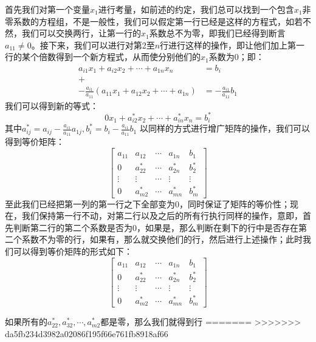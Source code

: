 \documentclass[a4paper,12pt]{ctexart}
\begin{document}
	\indent
	首先我们对第一个变量$x_1$进行考量，如前述的约定，我们总可以找到一个包含$x_1$非零系数的方程组，不是一般性，我们可以假定第一行已经是这样的方程式，如若不然，我们可以交换两行，让第一行的$x_1$系数总不为零，即我们已经得到断言$a_11 \neq 0$。接下来，我们可以进行对第2至$n$行进行这样的操作，即让他们加上第一行的某个倍数得到一个新方程式，从而使分别他们的$x_1$系数为0；即：
	\begin{align*}
	a_{i1}x_1+a_{i2}x_2 + \cdots + a_{1n}x_n &= b_i\\
	+\\
	-\frac{a_{i1}}{a_{11}}(a_{11}x_1+a_{12}x_2+\cdots+a_{1n}) &= -\frac{a_{i1}}{a_{11}}b_1
	\end{align*}
	我们可以得到新的等式：
	$$
	0{x_1}+a_{i2}^*x_2+\cdots+a_{in}^*x_n = b_i^*
	$$
	其中$a_{ij}^*=a_{ij}-\frac{a_{i1}}{a_{11}}a_{1j},b_i^*=b_i-\frac{a_{i1}}{a_{11}}b_1$
	以同样的方式进行增广矩阵的操作，我们可以得到等价矩阵：
	$$
		\left[
		\begin{array}{ccccc}
		a_{11} 	& a_{12} & \cdots & a_{1n} & b_1 \\
		0 		& a_{22}^* & \cdots & a_{2n}^* & b_2^* \\
		\vdots 	& \vdots & \cdots & \vdots & \vdots\\
		0 		& a_{m2}^* & \cdots & a_{mn}^* & b_m^*
		\end{array}
		\right]
	$$
	至此我们已经把第一列的第一行之下全部变为0，同时保证了矩阵的等价性；现在，我们保持第一行不动，对第二行以及之后的所有行执行同样的操作，意即，首先判断第二行的第二个系数是否为0，如果是，那么判断在剩下的行中是否存在第二个系数不为零的行，如果有，那么就交换他们的行，然后进行上述操作；此时我们可以得到等价矩阵的形式如下：
	$$
		\left[
		\begin{array}{ccccc}
		a_{11} 	& a_{12} & \cdots & a_{1n} & b_1 \\
		0 		& a_{22}^* & \cdots & a_{2n}^* & b_2^* \\
		\vdots 	& \vdots & \cdots & \vdots & \vdots\\
		0 		& a_{m2}^* & \cdots & a_{mn}^* & b_m^*
		\end{array}
		\right]
	$$
	
	如果所有的$a_{22}^*,a_{32}^*,\cdots,a_{m2}^*$都是零，那么我们就得到行
=======
>>>>>>> da5fb234d3982a02086f195f66e761fb8918af66
\end{document}
